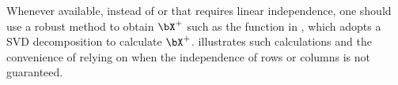 
Whenever available, instead of  or  that requires linear independence, one should use a robust method to obtain $\bX^+$ such as the  function in {\matlab}, which adopts a SVD decomposition to calculate $\bX^+$.  illustrates such calculations and the convenience of relying on  when the independence of rows or columns is not guaranteed.

